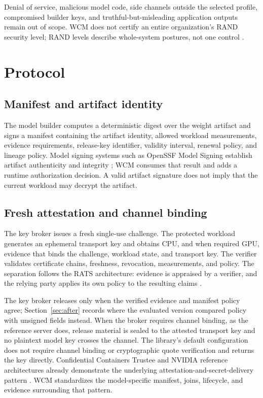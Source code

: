 \documentclass[10pt,letterpaper]{article}
\begin{document}
Denial of service, malicious model code, side channels outside the selected profile, compromised builder keys, and truthful-but-misleading application outputs remain out of scope. WCM does not certify an entire organization's RAND security level; RAND levels describe whole-system postures, not one control \citep{randweights}.

\section{Protocol}

\subsection{Manifest and artifact identity}

The model builder computes a deterministic digest over the weight artifact and signs a manifest containing the artifact identity, allowed workload measurements, evidence requirements, release-key identifier, validity interval, renewal policy, and lineage policy. Model signing systems such as OpenSSF Model Signing establish artifact authenticity and integrity \citep{oms}; WCM consumes that result and adds a runtime authorization decision. A valid artifact signature does not imply that the current workload may decrypt the artifact.

\subsection{Fresh attestation and channel binding}

The key broker issues a fresh single-use challenge. The protected workload generates an ephemeral transport key and obtains CPU, and when required GPU, evidence that binds the challenge, workload state, and transport key. The verifier validates certificate chains, freshness, revocation, measurements, and policy. The separation follows the RATS architecture: evidence is appraised by a verifier, and the relying party applies its own policy to the resulting claims \citep{rats}.

The key broker releases only when the verified evidence and manifest policy agree; Section~\ref{sec:after} records where the evaluated version compared policy with unsigned fields instead. When the broker requires channel binding, as the reference server does, release material is sealed to the attested transport key and no plaintext model key crosses the channel. The library's default configuration does not require channel binding or cryptographic quote verification and returns the key directly. Confidential Containers Trustee and NVIDIA reference architectures already demonstrate the underlying attestation-and-secret-delivery pattern \citep{trustee,nvidia2026}. WCM standardizes the model-specific manifest, joins, lifecycle, and evidence surrounding that pattern.
\end{document}
